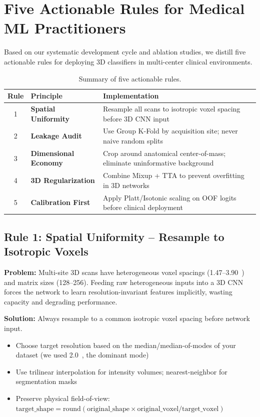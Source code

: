 \section{Five Actionable Rules for Medical ML Practitioners}
\label{sec:guidelines}

Based on our systematic development cycle and ablation studies, we distill five actionable rules for deploying 3D classifiers in multi-center clinical environments.

\begin{table}[H]
\centering
\caption{Summary of five actionable rules.}
\label{tab:rules}
\begin{tabular}{cll}
\toprule
\textbf{Rule} & \textbf{Principle} & \textbf{Implementation} \\
\midrule
1 & \textbf{Spatial Uniformity} & Resample all scans to isotropic voxel spacing before 3D CNN input \\
2 & \textbf{Leakage Audit} & Use Group K-Fold by acquisition site; never naive random splits \\
3 & \textbf{Dimensional Economy} & Crop around anatomical center-of-mass; eliminate uninformative background \\
4 & \textbf{3D Regularization} & Combine Mixup + TTA to prevent overfitting in 3D networks \\
5 & \textbf{Calibration First} & Apply Platt/Isotonic scaling on OOF logits before clinical deployment \\
\bottomrule
\end{tabular}
\end{table}

\subsection{Rule 1: Spatial Uniformity -- Resample to Isotropic Voxels}
\label{rule:spatial}

\textbf{Problem:} Multi-site 3D scans have heterogeneous voxel spacings (1.47--3.90~\voxelunit) and matrix sizes (128--256). Feeding raw heterogeneous inputs into a 3D CNN forces the network to learn resolution-invariant features implicitly, wasting capacity and degrading performance.

\textbf{Solution:} Always resample to a common isotropic voxel spacing before network input.
\begin{itemize}
    \item Choose target resolution based on the median/median-of-modes of your dataset (we used 2.0~\voxelunit, the dominant mode)
    \item Use trilinear interpolation for intensity volumes; nearest-neighbor for segmentation masks
    \item Preserve physical field-of-view: $\text{target\_shape} = \text{round}(\text{original\_shape} \times \text{original\_voxel} / \text{target\_voxel})$
\end{itemize}


